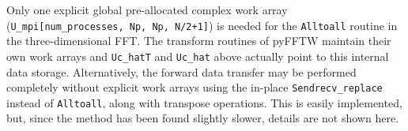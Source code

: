 \documentclass[final,3p,times,twocolumn]{elsarticle}
\newcommand{\inpyth}{\lstinline[style=inlinestyle]} %[]%
\begin{document}
Only one explicit global pre-allocated complex work array 
(\inpyth{U_mpi[num_processes, Np, Np, N/2+1]}) is needed for the 
\inpyth{Alltoall} routine in the three-dimensional FFT. The transform routines 
of pyFFTW maintain their own work arrays and \inpyth{Uc_hatT} and 
\inpyth{Uc_hat} above actually point to this internal data storage. 
Alternatively, the forward data transfer may be 
performed completely without explicit work arrays using the in-place \inpyth{Sendrecv_replace} instead of 
\inpyth{Alltoall}, along with transpose operations. This is easily implemented, but, since the method has been found slightly slower, details are not shown here.

\begin{figure}[th!]
\centering
{}
\end{figure}
\end{document}
